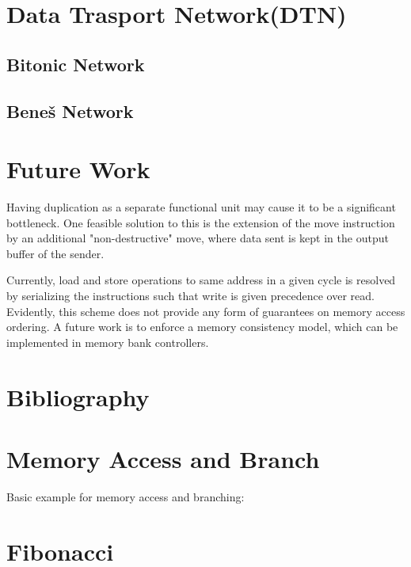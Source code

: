 \documentclass[adraft]{eptcs}
\begin{document}
	\section{Data Trasport Network(DTN)}
		

		\subsection{Bitonic Network}
			
			
		\FloatBarrier
		\subsection{Beneš Network}
			
		
		
	

	\section{Future Work}
	
	
		Having duplication as a separate functional unit may cause it to be a significant bottleneck.
		One feasible solution to this is the extension of the move instruction by an additional "non-destructive" move, where data sent is kept in the output buffer of the sender.
		
		
		Currently, load and store operations to same address in a given cycle is resolved by serializing the instructions such that write is given precedence over read. Evidently, this scheme does not provide any form of guarantees on memory access ordering.
		A future work is to enforce a memory consistency model, which can be implemented in memory bank controllers.
		

	\newpage
	\section{Bibliography}
		
		
	\newpage
	
	\begin{appendices}
		\section{Memory Access and Branch}
			\label{app:simple}
			Basic example for memory access and branching:
			
		
		\newpage
		\section{Fibonacci}
			\label{app:fib}
			
	\end{appendices}
	
\end{document}
